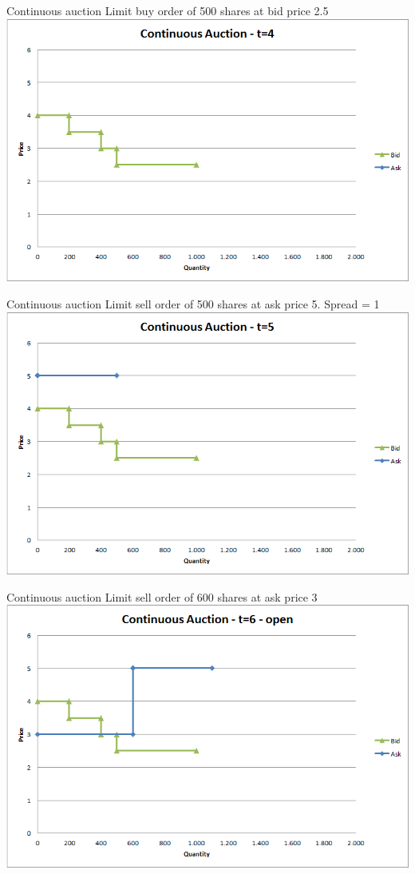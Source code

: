 \documentclass[english,10pt
,aspectratio=169
]{beamer}
\begin{document}
\begin{frame}{Continuous auction}
	Limit buy order of 500 shares at bid price 2.5
	\quad
	\center
	\includegraphics[width=.75\linewidth]{pics/ch1/Continuous_t4}
\end{frame}


\begin{frame}{Continuous auction}
	Limit sell order of 500 shares at ask price 5. Spread =  1
	\quad
	\center
	\includegraphics[width=.75\linewidth]{pics/ch1/Continuous_t5}
\end{frame}


\begin{frame}{Continuous auction}
	Limit sell order of 600 shares at ask price 3
	\quad
	\center
	\includegraphics[width=.75\linewidth]{pics/ch1/Continuous_t6open}
\end{frame}
\end{document}
